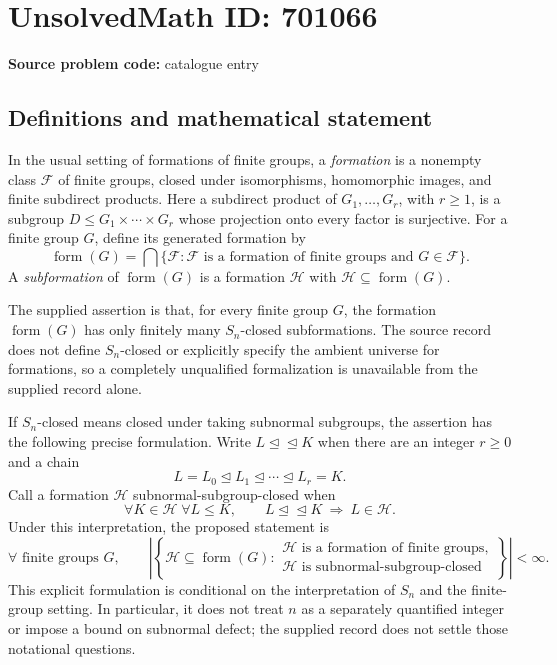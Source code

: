 \documentclass[11pt]{article}
\begin{document}
\section*{UnsolvedMath ID: 701066}
\textbf{Source problem code:} catalogue entry
\subsection{Definitions and mathematical statement}
In the usual setting of formations of finite groups, a \emph{formation} is a nonempty class \(\mathcal F\) of finite groups, closed under isomorphisms, homomorphic images, and finite subdirect products. Here a subdirect product of \(G_1,\ldots,G_r\), with \(r\geq 1\), is a subgroup \(D\leq G_1\times\cdots\times G_r\) whose projection onto every factor is surjective. For a finite group \(G\), define its generated formation by
\[
\operatorname{form}(G)=\bigcap\{\mathcal F: \mathcal F\text{ is a formation of finite groups and }G\in\mathcal F\}.
\]
A \emph{subformation} of \(\operatorname{form}(G)\) is a formation \(\mathcal H\) with \(\mathcal H\subseteq\operatorname{form}(G)\).

The supplied assertion is that, for every finite group \(G\), the formation \(\operatorname{form}(G)\) has only finitely many \(S_n\)-closed subformations. The source record does not define \(S_n\)-closed or explicitly specify the ambient universe for formations, so a completely unqualified formalization is unavailable from the supplied record alone.

If \(S_n\)-closed means closed under taking subnormal subgroups, the assertion has the following precise formulation. Write \(L\mathrel{\trianglelefteq\trianglelefteq}K\) when there are an integer \(r\geq 0\) and a chain
\[
L=L_0\trianglelefteq L_1\trianglelefteq\cdots\trianglelefteq L_r=K.
\]
Call a formation \(\mathcal H\) subnormal-subgroup-closed when
\[
\forall K\in\mathcal H\;\forall L\leq K,\qquad
L\mathrel{\trianglelefteq\trianglelefteq}K\ \Longrightarrow\ L\in\mathcal H.
\]
Under this interpretation, the proposed statement is
\[
\forall\text{ finite groups }G,\qquad
\left|\left\{\mathcal H\subseteq\operatorname{form}(G):
\begin{array}{l}
\mathcal H\text{ is a formation of finite groups},\\
\mathcal H\text{ is subnormal-subgroup-closed}
\end{array}
\right\}\right|<\infty.
\]
This explicit formulation is conditional on the interpretation of \(S_n\) and the finite-group setting. In particular, it does not treat \(n\) as a separately quantified integer or impose a bound on subnormal defect; the supplied record does not settle those notational questions.
\end{document}
